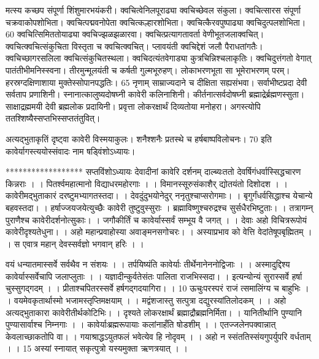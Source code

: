 मत्स्य कच्छप संपूर्णा शिंशुमारभयंकरी।
 क्वचित्वेनिलपूराढ्या क्वचिच्छेवल संकुला।
 क्वचित्सारस संपूर्णा चक्रवाकोपशोभिता।
 क्वचित्पद्मवनोपेता क्वचित्कल्हारशोभिता।
 क्वचित्कैरवपुष्पाढ्या क्वचिदुत्पलशोभिता।
 60 क्वचित्सिमिततोयाढ्या क्वचिज्झळझळारवा।
 क्वचित्प्रत्यागतावर्ता वेणीभूतजलाक्वचित्।
 क्वचित्क्वचित्संकुचिता विस्तृता च क्वचित्क्वचित्।
 प्लावयंती क्वचिद्देशं जलौ पैराधतांगतैः।
 क्वचिच्छागरसलिला क्वचित्संकुचितस्थला।
 क्वचिदत्यंतवेगाड्या कुत्रचिन्निश्चलाकृतिः।
 क्वचिदुत्तंगतो वेगात् पातंतीभीमनिस्स्वना।
 तीरमुन्मूलयंती च कर्षती गुल्मभूरुहण्।
 लोकाभरणभूता सा भूमेराभरणम् परम्।
 हरस्रग्दक्षिणाशाया मुक्तेस्सोपानपद्धतिः।
 65 नृणाम् साम्राज्यदाने च दीक्षिता सह्यसंभवा।
 सर्वाभीष्टप्रदा देवी सर्वताप प्रणाशिनी।
 स्नानात्कालुष्यदोषघ्नी कावेरी कलिनाशिनी।
 कीर्तनात्सर्वदोषघ्नी ब्रह्माद्रेर्ब्रह्मणस्सुता।
 साक्षाद्रह्ममयी देवी ब्रह्मलोक प्रदायिनी।
 प्रवृत्ता लोकरक्षार्थं दिव्यतोया मनोहरा।
 अगस्त्योपि ततश्शिष्यैस्सप्तभिस्सप्ततंतुवित्।
 
अत्यद्भुताकृतिं दृष्ट्वा कावेरी विस्मयाकुलः।
 शनैश्शनैः प्रतस्थे च हर्षबाष्पविलोचनः।
 70 इति कावेर्यागस्त्ययोस्संवादः नाम षड्विंशोऽध्यायः।

******************
सप्तविंशोऽध्यायः
देवादीनां कावेरि दर्शनम् दाल्ब्यःततो देवर्षिगंधर्वास्सिद्धचारण किन्नराः ।
।
 पितर्श्वमहात्मानो विद्याधरमहोरगाः ।
 ।
 विमानस्सूरुसंकाशैर् द्योतयंतो दिशोदश ।
 ।
 कावेरीमद्भुताकारं दरष्टुमभ्यागतस्तदा।
 ।
 देवदुंदुभयोनेदुर् ननृतुश्चाप्सरोगमाः।
 ।
 बृगुर्गंधर्वसिद्धाश्च येचान्ये बहवस्तदा।
 ।
 हर्षाज्जयजयेत्युच्छैः कावेरी तुष्टुवुस्सुराः ।
 ब्रह्माविष्णुश्चरुद्रश्च सुर्सधैरभिष्टुताः।
 ।
 तत्रागम्न् पुराणैश्च कावेरीदर्शनोत्सुकाः।
 ।
 जगौकीर्तिं च कावेर्यास्सर्वं सम्भूय वै जगत् ।
 ।
 देवाः अहो विचित्ररूपोयं कावेरीदृश्यतेधुना।
 ।
 अहो महान्प्रवाहोस्या अवाङ्मनसगोचरः।
 ।
 अस्याप्रभाव को वेत्ति वेदांतेषूपबृह्मितम् ।
 ।
 स एवात्र महान् देवस्सर्वज्ञो भगवान् हरिः ।
 ।

वयं धन्यातमास्सर्वे सर्वथैव न संशयः ।
।
 तर्पयिष्यंति कावेर्याः तीर्थेनानेननोद्विजाः ।
 ।
 अस्मादुद्दिश्य कावेर्यास्सर्वेचापि जलाप्लुताः ।
 ।
 यज्ञादीन्कुर्वतेसंतः पालिता राजभिस्सदा।
 ।
 इत्यन्योन्यं सुरास्सर्वे हर्षा चुस्सुगद्गदम् ।
 ।
 प्रीताश्चपितरस्सर्वे हर्षगद्गदयागिरा।
 ।
 10 ऊचुःपरस्परं राजं त्समालिंग्य च बाहुभिः ।
 ।
 वयमेवकृतार्थास्मो भजामस्तृप्तिमक्षयाम् ।
 ।
 मद्वंशजास्तु सत्पुत्रा दद्युरस्यांतिलोदकम् ।
 ।
 अहो अत्यद्भुताकारा कावेरीतीर्थकोटिभिः।
 ।
 दृश्यते लोकरक्षार्थं ब्रह्माद्रौब्रह्मनिर्मिता।
 ।
 यानितीर्थानि पुण्यानि पुण्यासार्वाश्च निम्नगाः ।
 ।
 कावेर्याःब्रह्मरूपायाः कलांनाहँति षोडशीम् ।
 ।
 एतज्जलेनपक्वान्नात् केवलाच्छाकतोपि वा।
 ।
 गयाश्राद्धऽयुतफलं भवेत्येव हि नोदृवम् ।
 ।
 अहो न स्संततिस्संयगुपर्युपरि वर्धताम् ।
 ।
15 अस्यां स्नायात् सकृत्पुत्रो यस्यमुक्ता ऋणत्रयात् ।
।

